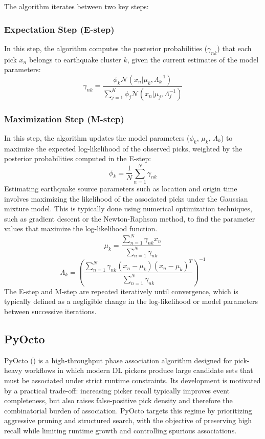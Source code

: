 The algorithm iterates between two key steps:

\subsubsection{Expectation Step (E-step)}
In this step, the algorithm computes the posterior probabilities
($\gamma_{nk}$) that each pick $x_n$ belongs to earthquake cluster $k$, given
the current estimates of the model parameters:
\begin{equation}
  \gamma_{nk} = \frac{\phi_k \mathcal{N}(x_n|\mu_k, \Lambda_k^{-1})}
  {\sum_{j=1}^{K} \phi_j \mathcal{N}(x_n|\mu_j, \Lambda_j^{-1})}
\end{equation}

\subsubsection{Maximization Step (M-step)}
In this step, the algorithm updates the model parameters ($\phi_k$, $\mu_k$,
$\Lambda_k$) to maximize the expected log-likelihood of the observed picks,
weighted by the posterior probabilities computed in the E-step:
\begin{equation}
  \phi_k = \frac{1}{N} \sum_{n=1}^{N} \gamma_{nk}
\end{equation}
Estimating earthquake source parameters such as location and origin time
involves maximizing the likelihood of the associated picks under the Gaussian
mixture model. This is typically done using numerical optimization techniques,
such as gradient descent or the Newton-Raphson method, to find the parameter
values that maximize the log-likelihood function.
\begin{equation}
  \mu_k = \frac{\sum_{n=1}^{N} \gamma_{nk} x_n}{\sum_{n=1}^{N} \gamma_{nk}}
\end{equation}
\begin{equation}
  \Lambda_k = \left( \frac{\sum_{n=1}^{N} \gamma_{nk} (x_n -
    \mu_k)(x_n - \mu_k)^T}
  {\sum_{n=1}^{N} \gamma_{nk}} \right)^{-1}
\end{equation}
The E-step and M-step are repeated iteratively until convergence, which is
typically defined as a negligible change in the log-likelihood or model
parameters between successive iterations.

\subsection{PyOcto}

PyOcto (\cite{PyOcto}) is a high-throughput phase association algorithm
designed for pick-heavy workflows in which modern \ac{DL} pickers produce
large candidate sets that must be associated under strict runtime constraints.
Its development is motivated by a practical trade-off: increasing picker
recall typically improves event completeness, but also raises false-positive
pick density and therefore the combinatorial burden of association. PyOcto
targets this regime by prioritizing aggressive pruning and structured search,
with the objective of preserving high recall while limiting runtime growth and
controlling spurious associations.

